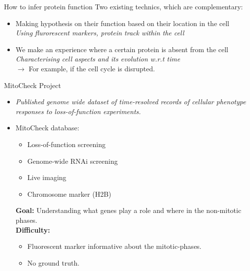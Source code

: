 \documentclass{beamer}
\begin{document}
\begin{frame}{How to infer protein function}
Two existing technics, which are complementary:
\begin{itemize}
\item Making hypothesis on their function based on their location in the cell \\ 
\textit{Using flurorescent markers, protein track within the cell} 
\item We make an experience where a certain protein is absent from the cell \\ 
\textit{Characterising cell aspects and its evolution w.r.t time} \\ 
 $\rightarrow$ For example, if the cell cycle is disrupted.
\end{itemize}
\end{frame}


\begin{frame}{MitoCheck Project}
\begin{itemize}
\item<1> \begin{center}
{\small \textit{Published genome wide dataset of time-resolved records of cellular phenotype responses to loss-of-function experiments.} }\\ 
\end{center}

\item<2> MitoCheck database: 
\begin{itemize}
\item Loss-of-function screening
\item Genome-wide RNAi screening
\item Live imaging
\item Chromosome marker (H2B)
\end{itemize} 

\textbf{Goal:} Understanding what genes play a role and where in the non-mitotic phases. \\
\textbf{Difficulty:} \begin{itemize}
    \item Fluorescent marker informative about the mitotic-phases.
    \item No ground truth.
    \end{itemize}
\end{itemize}
\end{frame}
\end{document}
